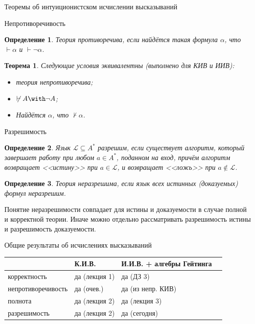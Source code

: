 \documentclass[aspectratio=169]{beamer}
\begin{document}
\newtheorem{axiom}{Аксиома}
\newtheorem{exmprus}{Пример}
\newtheorem{defrus}{Определение}
\newtheorem{lemmarus}{Лемма}
\newtheorem{thmrus}{Теорема}

\begin{frame}{}
\begin{center}\Large Теоремы об интуиционистском исчислении высказываний\end{center}
\end{frame}

\begin{frame}{Непротиворечивость}
\begin{defrus}
Теория противоречива, если найдётся такая формула $\alpha$, что $\vdash\alpha$ и $\vdash\neg\alpha$.
\end{defrus}

\begin{thmrus}
Следующие условия эквивалентны (выполнено для КИВ и ИИВ):
\begin{itemize}
\item теория непротиворечива;
\item $\not\vdash A \with \neg A$;
\item Найдётся $\alpha$, что $\not\vdash\alpha$.
\end{itemize}
\end{thmrus}
\end{frame}

\begin{frame}{Разрешимость}
\begin{defrus}
Язык $\mathcal{L} \subseteq A^*$ разрешим, если существует алгоритм, который
завершает работу при любом $a \in A^*$, поданном на вход,
причём алгоритм возвращает <<истину>> при $a \in \mathcal{L}$, 
и возвращает <<ложь>> при $a \notin \mathcal{L}$.
\end{defrus}

\begin{defrus}
Теория неразрешима, если язык всех истинных (доказуемых) формул неразрешим.
\end{defrus}

Понятие неразрешимости совпадает для истины и доказуемости в случае полной и корректной теории.
Иначе можно отдельно рассматривать разрешимость истины и разрешимость доказуемости.
\end{frame}

\begin{frame}{Общие результаты об исчислениях высказываний}
\begin{tabular}{llll}
      & К.И.В. & И.И.В. + алгебры Гейтинга\\\hline
корректность & да (лекция 1) & да (ДЗ 3) \\
непротиворечивость & да (очев.) & да (из непр. КИВ) \\
полнота & да (лекция 2) & да (лекция 3)  \\
разрешимость & да (лекция 2) & да (сегодня)
\end{tabular}
\end{frame}
\end{document}
